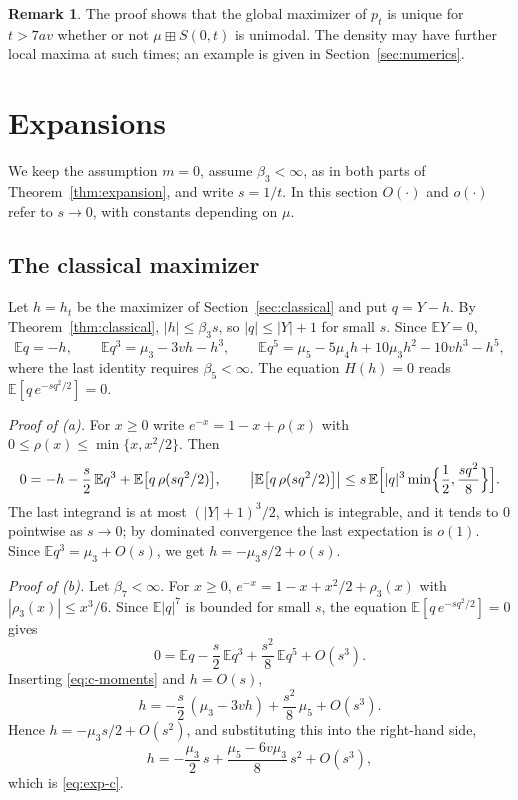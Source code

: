 \documentclass[11pt]{amsart}
\theoremstyle{definition}
\newtheorem{remark}[theorem]{Remark}
\newcommand{\E}{\mathbb{E}}
\begin{document}
\begin{remark}
The proof shows that the global maximizer of $p_t$ is unique for $t>7av$ whether or not $\mu\boxplus S(0,t)$ is
unimodal. The density may have further local maxima at such times; an example is given in
Section~\ref{sec:numerics}.
\end{remark}

\section{Expansions}\label{sec:expansion}

We keep the assumption $m=0$, assume $\beta_3<\infty$, as in both parts of Theorem~\ref{thm:expansion}, and write
$s=1/t$. In this section $O(\cdot)$ and $o(\cdot)$ refer to $s\to0$, with
constants depending on $\mu$.

\subsection{The classical maximizer}
Let $h=h_t$ be the maximizer of Section~\ref{sec:classical} and put $q=Y-h$. By Theorem~\ref{thm:classical},
$|h|\le\beta_3s$, so $|q|\le|Y|+1$ for small $s$. Since $\E Y=0$,
\begin{equation}\label{eq:c-moments}
\E q=-h,\qquad \E q^3=\mu_3-3vh-h^3,\qquad \E q^5=\mu_5-5\mu_4h+10\mu_3h^2-10vh^3-h^5,
\end{equation}
where the last identity requires $\beta_5<\infty$. The equation $H(h)=0$ reads $\E[q\,e^{-sq^2/2}]=0$.

\emph{Proof of {\rm(a)}.} For $x\ge0$ write $e^{-x}=1-x+\rho(x)$ with $0\le\rho(x)\le\min\{x,x^2/2\}$. Then
\[
0=-h-\frac s2\,\E q^3+\E\bigl[q\,\rho(sq^2/2)\bigr],\qquad
\bigl|\E\bigl[q\,\rho(sq^2/2)\bigr]\bigr|\le s\,\E\Bigl[|q|^3\min\Bigl\{\frac12,\frac{sq^2}{8}\Bigr\}\Bigr].
\]
The last integrand is at most $(|Y|+1)^3/2$, which is integrable, and it tends to $0$ pointwise as $s\to0$; by
dominated convergence the last expectation is $o(1)$. Since $\E q^3=\mu_3+O(s)$, we get $h=-\mu_3s/2+o(s)$.

\emph{Proof of {\rm(b)}.} Let $\beta_7<\infty$. For $x\ge0$, $e^{-x}=1-x+x^2/2+\rho_3(x)$ with $|\rho_3(x)|\le x^3/6$.
Since $\E|q|^7$ is bounded for small $s$, the equation $\E[q\,e^{-sq^2/2}]=0$ gives
\[
0=\E q-\frac s2\,\E q^3+\frac{s^2}8\,\E q^5+O(s^3).
\]
Inserting \eqref{eq:c-moments} and $h=O(s)$,
\[
h=-\frac s2\,(\mu_3-3vh)+\frac{s^2}{8}\,\mu_5+O(s^3).
\]
Hence $h=-\mu_3s/2+O(s^2)$, and substituting this into the right-hand side,
\[
h=-\frac{\mu_3}{2}\,s+\frac{\mu_5-6v\mu_3}{8}\,s^2+O(s^3),
\]
which is \eqref{eq:exp-c}.
\end{document}
